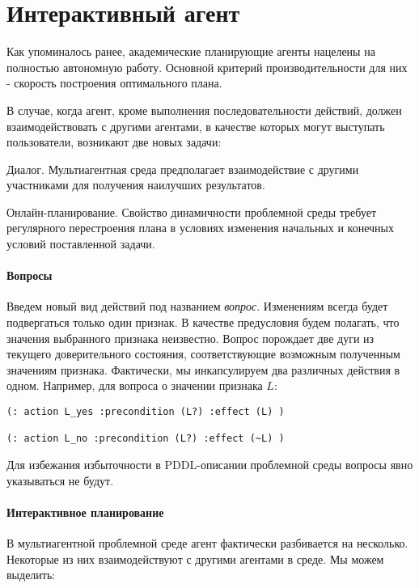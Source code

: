 \chapter{Интерактивный агент}

Как упоминалось ранее, академические планирующие агенты нацелены на полностью автономную работу. Основной критерий производительности для них - скорость построения оптимального плана.

В случае, когда агент, кроме выполнения последовательности действий,
должен взаимодействовать с другими агентами, в качестве которых могут
выступать пользователи, возникают две новых задачи:

\begin{itemize*}
\item
  Диалог. Мультиагентная среда предполагает взаимодействие с другими
  участниками для получения наилучших результатов.
\item
  Онлайн-планирование. Свойство динамичности проблемной среды требует
  регулярного перестроения плана в условиях изменения начальных и
  конечных условий поставленной задачи.
\end{itemize*}

\subsubsection{Вопросы}

Введем новый вид действий под названием \emph{вопрос}. Изменениям всегда
будет подвергаться только один признак. В качестве предусловия будем
полагать, что значения выбранного признака неизвестно. Вопрос порождает
две дуги из текущего доверительного состояния, соответствующие возможным
полученным значениям признака. Фактически, мы инкапсулируем два
различных действия в одном. Например, для вопроса о значении признака
$L$:

\begin{verbatim}
(: action L_yes :precondition (L?) :effect (L) )

(: action L_no :precondition (L?) :effect (~L) )
\end{verbatim}

Для избежания избыточности в PDDL-описании проблемной среды вопросы явно
указываться не будут.

\subsubsection{Интерактивное планирование}

В мультиагентной проблемной среде агент фактически разбивается на
несколько. Некоторые из них взаимодействуют с другими агентами в среде.
Мы можем выделить:

